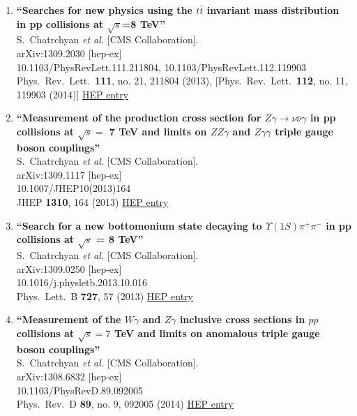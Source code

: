 \documentclass{article}
\begin{document}
\begin{enumerate}
\item%
{\bf ``Searches for new physics using the $t\bar{t}$ invariant mass distribution in pp collisions at $\sqrt{s}$=8  TeV''}
  \\{}S.~Chatrchyan {\it et al.} [CMS Collaboration].
  \\{}arXiv:1309.2030 [hep-ex]
    \\{}10.1103/PhysRevLett.111.211804, 10.1103/PhysRevLett.112.119903
\\{}Phys.\ Rev.\ Lett.\  {\bf 111}, no. 21, 211804 (2013), [Phys.\ Rev.\ Lett.\  {\bf 112}, no. 11, 119903 (2014)] %
\href{http://inspirehep.net/record/1253367}{HEP entry}


\item%
{\bf ``Measurement of the production cross section for $Z\gamma \to \nu\bar{\nu}\gamma$ in pp collisions at $\sqrt{s} =$ 7 TeV and limits on $ZZ\gamma$ and $Z\gamma\gamma$ triple gauge boson couplings''}
  \\{}S.~Chatrchyan {\it et al.} [CMS Collaboration].
  \\{}arXiv:1309.1117 [hep-ex]
    \\{}10.1007/JHEP10(2013)164
\\{}JHEP {\bf 1310}, 164 (2013) %
\href{http://inspirehep.net/record/1252719}{HEP entry}


\item%
{\bf ``Search for a new bottomonium state decaying to $\Upsilon(1S)\pi^+\pi^-$ in pp collisions at $\sqrt{s}$ = 8 TeV''}
  \\{}S.~Chatrchyan {\it et al.} [CMS Collaboration].
  \\{}arXiv:1309.0250 [hep-ex]
    \\{}10.1016/j.physletb.2013.10.016
\\{}Phys.\ Lett.\ B {\bf 727}, 57 (2013) %
\href{http://inspirehep.net/record/1252068}{HEP entry}


\item%
{\bf ``Measurement of the $W\gamma$ and $Z\gamma$ inclusive cross sections in $pp$ collisions at $\sqrt s=7$  TeV and limits on anomalous triple gauge boson couplings''}
  \\{}S.~Chatrchyan {\it et al.} [CMS Collaboration].
  \\{}arXiv:1308.6832 [hep-ex]
    \\{}10.1103/PhysRevD.89.092005
\\{}Phys.\ Rev.\ D {\bf 89}, no. 9, 092005 (2014) %
\href{http://inspirehep.net/record/1251905}{HEP entry}



\end{enumerate}
\end{document}
